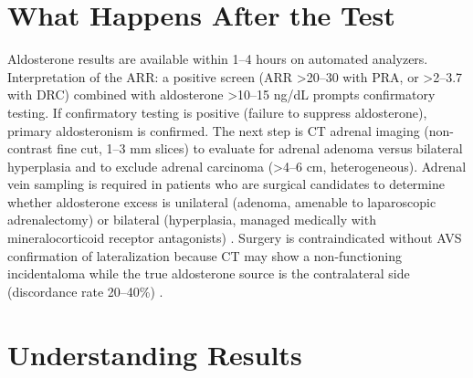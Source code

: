 \section*{What Happens After the Test}
Aldosterone results are available within 1--4 hours on automated analyzers. Interpretation of the ARR: a positive screen (ARR >20--30 with PRA, or >2--3.7 with DRC) combined with aldosterone >10--15 ng/dL prompts confirmatory testing. If confirmatory testing is positive (failure to suppress aldosterone), primary aldosteronism is confirmed. The next step is CT adrenal imaging (non-contrast fine cut, 1--3 mm slices) to evaluate for adrenal adenoma versus bilateral hyperplasia and to exclude adrenal carcinoma (>4--6 cm, heterogeneous). Adrenal vein sampling is required in patients who are surgical candidates to determine whether aldosterone excess is unilateral (adenoma, amenable to laparoscopic adrenalectomy) or bilateral (hyperplasia, managed medically with mineralocorticoid receptor antagonists) \cite{rossi2014expert}. Surgery is contraindicated without AVS confirmation of lateralization because CT may show a non-functioning incidentaloma while the true aldosterone source is the contralateral side (discordance rate 20--40\%) \cite{rossi2014expert}.

\section*{Understanding Results}

